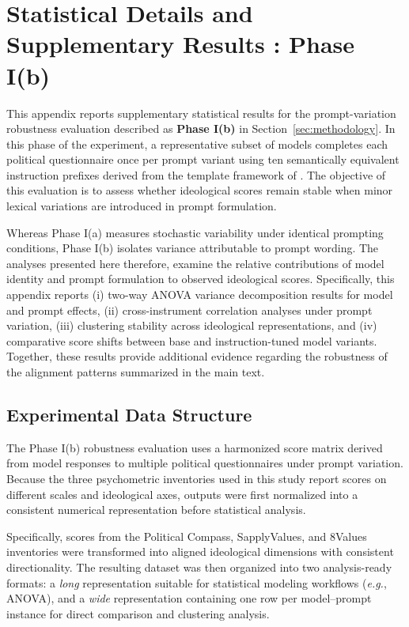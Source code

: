 \documentclass[11pt]{article}
\begin{document}
\section{Statistical Details and Supplementary Results : \textbf{Phase I(b)}}
\label{sec:appendix-prompt-robustness}

This appendix reports supplementary statistical results for the prompt-variation robustness evaluation described as \textbf{Phase I(b)} in Section~\ref{sec:methodology}. In this phase of the experiment, a representative subset of models completes each political questionnaire once per prompt variant using ten semantically equivalent instruction prefixes derived from the template framework of \citet{rottger-etal-2024-political}. The objective of this evaluation is to assess whether ideological scores remain stable when minor lexical variations are introduced in prompt formulation.

Whereas Phase I(a) measures stochastic variability under identical prompting conditions, Phase I(b) isolates variance attributable to prompt wording. The analyses presented here therefore, examine the relative contributions of model identity and prompt formulation to observed ideological scores. Specifically, this appendix reports (i) two-way ANOVA variance decomposition results for model and prompt effects, (ii) cross-instrument correlation analyses under prompt variation, (iii) clustering stability across ideological representations, and (iv) comparative score shifts between base and instruction-tuned model variants. Together, these results provide additional evidence regarding the robustness of the alignment patterns summarized in the main text.


\subsection{Experimental Data Structure}
\label{app:phaseib-data}

The Phase I(b) robustness evaluation uses a harmonized score matrix derived from model responses to multiple political questionnaires under prompt variation. Because the three psychometric inventories used in this study report scores on different scales and ideological axes, outputs were first normalized into a consistent numerical representation before statistical analysis.

Specifically, scores from the Political Compass, SapplyValues, and 8Values inventories were transformed into aligned ideological dimensions with consistent directionality. The resulting dataset was then organized into two analysis-ready formats: a \textit{long} representation suitable for statistical modeling workflows (\textit{e.g.}, ANOVA), and a \textit{wide} representation containing one row per model–prompt instance for direct comparison and clustering analysis.
\end{document}
